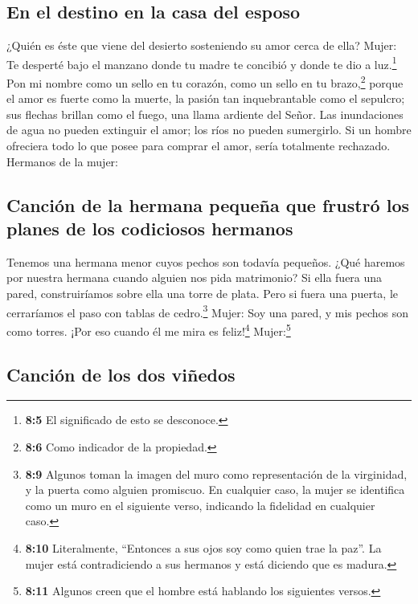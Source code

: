 \hypertarget{en-el-destino-en-la-casa-del-esposo}{%
\subsection{En el destino en la casa del
esposo}\label{en-el-destino-en-la-casa-del-esposo}}

 ¿Quién es éste que viene del desierto sosteniendo su amor
cerca de ella? Mujer: Te desperté bajo el manzano donde tu madre te
concibió y donde te dio a luz.\footnote{\textbf{8:5} El significado de
  esto se desconoce.}  Pon mi nombre como un sello en tu
corazón, como un sello en tu brazo,\footnote{\textbf{8:6} Como indicador
  de la propiedad.} porque el amor es fuerte como la muerte, la pasión
tan inquebrantable como el sepulcro; sus flechas brillan como el fuego,
una llama ardiente del Señor.  Las inundaciones de agua no
pueden extinguir el amor; los ríos no pueden sumergirlo. Si un hombre
ofreciera todo lo que posee para comprar el amor, sería totalmente
rechazado. Hermanos de la mujer:

\hypertarget{canciuxf3n-de-la-hermana-pequeuxf1a-que-frustruxf3-los-planes-de-los-codiciosos-hermanos}{%
\subsection{Canción de la hermana pequeña que frustró los planes de los
codiciosos
hermanos}\label{canciuxf3n-de-la-hermana-pequeuxf1a-que-frustruxf3-los-planes-de-los-codiciosos-hermanos}}

 Tenemos una hermana menor cuyos pechos son todavía
pequeños. ¿Qué haremos por nuestra hermana cuando alguien nos pida
matrimonio?  Si ella fuera una pared, construiríamos sobre
ella una torre de plata. Pero si fuera una puerta, le cerraríamos el
paso con tablas de cedro.\footnote{\textbf{8:9} Algunos toman la imagen
  del muro como representación de la virginidad, y la puerta como
  alguien promiscuo. En cualquier caso, la mujer se identifica como un
  muro en el siguiente verso, indicando la fidelidad en cualquier caso.}
Mujer:  Soy una pared, y mis pechos son como torres. ¡Por
eso cuando él me mira es feliz!\footnote{\textbf{8:10} Literalmente,
  ``Entonces a sus ojos soy como quien trae la paz''. La mujer está
  contradiciendo a sus hermanos y está diciendo que es madura.}
Mujer:\footnote{\textbf{8:11} Algunos creen que el hombre está hablando
  los siguientes versos.}

\hypertarget{canciuxf3n-de-los-dos-viuxf1edos}{%
\subsection{Canción de los dos
viñedos}\label{canciuxf3n-de-los-dos-viuxf1edos}}

